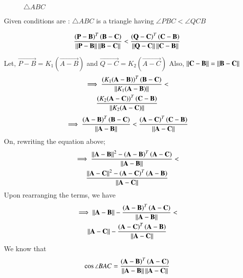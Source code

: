 \begin{figure}[hb]
	\centering
	\resizebox{\columnwidth}{!}{}
	\caption{$\triangle ABC$}
	\end{figure}
	
Given conditions are : $\triangle {ABC}$  is a triangle having $\angle PBC < \angle QCB $

\begin{align}
\frac{\left( \mathbf{P - B} \right)^T  \left( \mathbf{B - C } \right)}{\left\lVert\mathbf{ P - B}\right\rVert \left\lVert\mathbf{B - C}\right\rVert}<\frac{\left( \mathbf{ Q - C} \right)^T  \left( \mathbf{C - B} \right)}{\left\lVert\mathbf{ Q - C}\right\rVert \left\lVert\mathbf{C - B}\right\rVert}
\end{align}

Let, $\vec{ P - B}= K_1 (\vec{ A - B})$ and $\vec{ Q - C} = K_2 (\vec{ A - C})$
Also, $\left\lVert\mathbf{C - B}\right\rVert = \left\lVert\mathbf{B - C}\right\rVert$
\begin{multline}
\implies\frac{\left(K_1 (\mathbf{A - B}) \right)^T  \left( \mathbf{B - C } \right)}{\left\lVert K_1(\mathbf{ A - B})\right\rVert }<\\\frac{\left(K_2 (\mathbf{A - C}) \right)^T  \left( \mathbf{C - B} \right)}{\left\lVert K_2(\mathbf{ A - C})\right\rVert}
\end{multline}
\begin{align}
\implies\frac{\left( \mathbf{A - B} \right)^T  \left( \mathbf{B - C } \right)}{\left\lVert\mathbf{ A - B}\right\rVert }<\frac{\left( \mathbf{ A - C} \right)^T  \left( \mathbf{C - B} \right)}{\left\lVert\mathbf{ A - C}\right\rVert}
\end{align}
On, rewriting the equation above;
\begin{multline}
\implies\frac{\left\lVert\mathbf{ A - B}\right\rVert^2 - \left( \mathbf{A - B } \right)^T \left( \mathbf{A - C } \right)}{\left\lVert\mathbf{ A - B}\right\rVert}<\\ \frac{\left\lVert\mathbf{ A - C}\right\rVert^2 - \left( \mathbf{A - C } \right)^T \left( \mathbf{A - B } \right)}{\left\lVert\mathbf{ A - C}\right\rVert}
\end{multline}
Upon rearranging the terms, we have
\begin{multline}
\implies\left\lVert\mathbf{ A - B}\right\rVert-\frac{ \left( \mathbf{A - B } \right)^T \left( \mathbf{A - C } \right)}{\left\lVert\mathbf{ A - B}\right\rVert}<\\ \left\lVert\mathbf{ A - C}\right\rVert-\frac{ \left( \mathbf{A - C } \right)^T \left( \mathbf{A - B } \right)}{\left\lVert\mathbf{ A - C}\right\rVert}\label{eq:solutions/1/41/eq1}
\end{multline}
We know that 
\begin{align}
\cos\angle BAC= \frac{\left( \mathbf{A - B } \right)^T \left( \mathbf{A - C } \right)}{\left\lVert\mathbf{ A - B}\right\rVert\left\lVert\mathbf{ A - C}\right\rVert}
\end{align}
